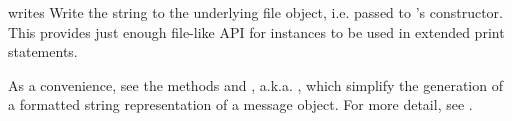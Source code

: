 \begin{methoddesc}[Generator]{write}{s}
Write the string  to the underlying file object,
i.e.  passed to 's constructor.  This
provides just enough file-like API for  instances to
be used in extended print statements.
\end{methoddesc}

As a convenience, see the methods  and
, a.k.a. , which
simplify the generation of a formatted string representation of a
message object.  For more detail, see .

